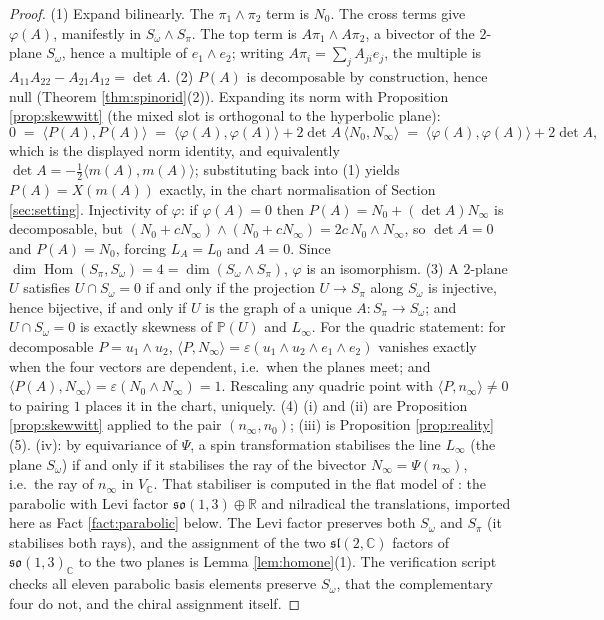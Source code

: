 \documentclass[11pt]{article}
\theoremstyle{definition}
\newcommand{\R}{\mathbb{R}}
\newcommand{\C}{\mathbb{C}}
\newcommand{\nO}{n_0}
\newcommand{\nInf}{n_\infty}
\newcommand{\ip}[2]{\langle #1, #2\rangle}
\newcommand{\Som}{S_\omega}
\newcommand{\Spi}{S_\pi}
\begin{document}
\begin{proof}
(1) Expand bilinearly. The $\pi_1\wedge\pi_2$ term is $N_0$. The cross terms give $\varphi(A)$, manifestly in $\Som\wedge\Spi$. The top term is $A\pi_1\wedge A\pi_2$, a bivector of the $2$-plane $\Som$, hence a multiple of $e_1\wedge e_2$; writing $A\pi_i = \sum_j A_{ji}e_j$, the multiple is $A_{11}A_{22} - A_{21}A_{12} = \det A$.
(2) $P(A)$ is decomposable by construction, hence null (Theorem \ref{thm:spinorid}(2)). Expanding its norm with Proposition \ref{prop:skewwitt} (the mixed slot is orthogonal to the hyperbolic plane):
\[
0 \;=\; \ip{P(A)}{P(A)} \;=\; \ip{\varphi(A)}{\varphi(A)} + 2\det A\,\ip{N_0}{N_\infty}
 \;=\; \ip{\varphi(A)}{\varphi(A)} + 2\det A ,
\]
which is the displayed norm identity, and equivalently $\det A = -\tfrac12\ip{m(A)}{m(A)}$; substituting back into (1) yields $P(A) = X(m(A))$ exactly, in the chart normalisation of Section \ref{sec:setting}. Injectivity of $\varphi$: if $\varphi(A) = 0$ then $P(A) = N_0 + (\det A)N_\infty$ is decomposable, but $(N_0 + cN_\infty)\wedge(N_0 + cN_\infty) = 2c\,N_0\wedge N_\infty$, so $\det A = 0$ and $P(A) = N_0$, forcing $L_A = L_0$ and $A = 0$. Since $\dim \operatorname{Hom}(\Spi,\Som) = 4 = \dim(\Som\wedge\Spi)$, $\varphi$ is an isomorphism.
(3) A $2$-plane $U$ satisfies $U \cap \Som = 0$ if and only if the projection $U \to \Spi$ along $\Som$ is injective, hence bijective, if and only if $U$ is the graph of a unique $A: \Spi \to \Som$; and $U \cap \Som = 0$ is exactly skewness of $\mathbb{P}(U)$ and $L_\infty$. For the quadric statement: for decomposable $P = u_1\wedge u_2$, $\ip{P}{N_\infty} = \varepsilon(u_1\wedge u_2\wedge e_1\wedge e_2)$ vanishes exactly when the four vectors are dependent, i.e.\ when the planes meet; and $\ip{P(A)}{N_\infty} = \varepsilon(N_0\wedge N_\infty) = 1$. Rescaling any quadric point with $\ip{P}{\nInf} \neq 0$ to pairing $1$ places it in the chart, uniquely.
(4) (i) and (ii) are Proposition \ref{prop:skewwitt} applied to the pair $(\nInf, \nO)$; (iii) is Proposition \ref{prop:reality}(5). (iv): by equivariance of $\Psi$, a spin transformation stabilises the line $L_\infty$ (the plane $\Som$) if and only if it stabilises the ray of the bivector $N_\infty = \Psi(\nInf)$, i.e.\ the ray of $\nInf$ in $V_\C$. That stabiliser is computed in the flat model of \cite{ButlerT6}: the parabolic with Levi factor $\mathfrak{so}(1,3)\oplus\R$ and nilradical the translations, imported here as Fact \ref{fact:parabolic} below. The Levi factor preserves both $\Som$ and $\Spi$ (it stabilises both rays), and the assignment of the two $\mathfrak{sl}(2,\C)$ factors of $\mathfrak{so}(1,3)_\C$ to the two planes is Lemma \ref{lem:homone}(1). The verification script checks all eleven parabolic basis elements preserve $\Som$, that the complementary four do not, and the chiral assignment itself.
\end{proof}
\end{document}
